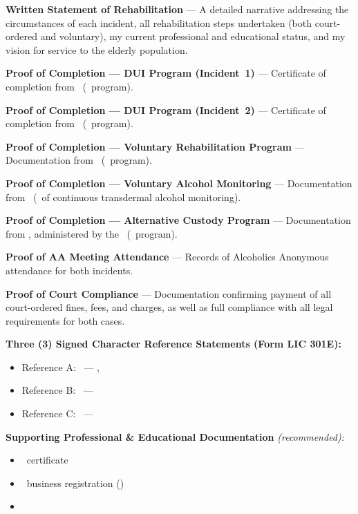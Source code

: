 \begin{enclosurelist}
  \item \textbf{Written Statement of Rehabilitation} --- A detailed narrative addressing the circumstances of each incident, all rehabilitation steps undertaken (both court-ordered and voluntary), my current professional and educational status, and my vision for service to the elderly population.

  \item \textbf{Proof of Completion --- DUI Program (Incident~1)} --- Certificate of completion from \DUIProgramOne\ (\DUIProgramOneDuration\ program).

  \item \textbf{Proof of Completion --- DUI Program (Incident~2)} --- Certificate of completion from \DUIProgramTwo\ (\DUIProgramTwoDuration\ program).

  \item \textbf{Proof of Completion --- Voluntary Rehabilitation Program} --- Documentation from \RehabProgram\ (\RehabDuration\ program).

  \item \textbf{Proof of Completion --- Voluntary Alcohol Monitoring} --- Documentation from \SCRAMProgramShort\ (\SCRAMDuration\ of continuous transdermal alcohol monitoring).

  \item \textbf{Proof of Completion --- Alternative Custody Program} --- Documentation from \CPACProgram, administered by the \CPACAdmin\ (\CPACDuration\ program).

  \item \textbf{Proof of AA Meeting Attendance} --- Records of Alcoholics Anonymous attendance for both incidents.

  \item \textbf{Proof of Court Compliance} --- Documentation confirming payment of all court-ordered fines, fees, and charges, as well as full compliance with all legal requirements for both cases.

  \item \textbf{Three (3) Signed Character Reference Statements (Form LIC 301E):}
  \begin{itemize}[leftmargin=1.5em, itemsep=0.15em]
    \item Reference A: \RefAName\ --- \RefATitle, \RefAOrg
    \item Reference B: \RefBName\ --- \RefBTitle
    \item Reference C: \RefCName\ --- \RefCTitle
  \end{itemize}

  \item \textbf{Supporting Professional \& Educational Documentation} \textit{(recommended):}
  \begin{itemize}[leftmargin=1.5em, itemsep=0.15em]
    \item \RCFETraining\ certificate
    \item \LLCName\ business registration (\LLCDate)
    \item {}
  \end{itemize}
\end{enclosurelist}


